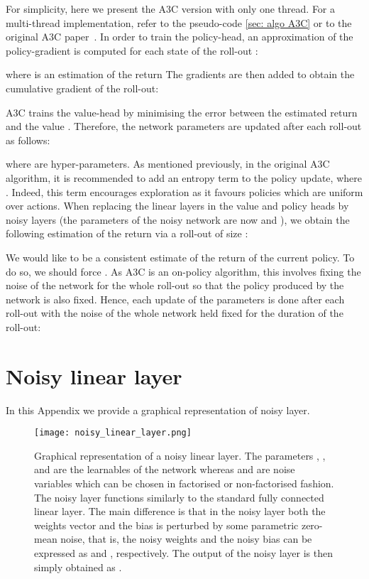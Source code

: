 \documentclass{article}
\begin{document}
For simplicity, here we present the A3C version with only one thread. For a  multi-thread implementation, refer to the pseudo-code \ref{sec: algo A3C} or to the original A3C paper~\citep{mnih2016asynchronous}. In order to train the policy-head, an approximation of the policy-gradient is computed for each state of the roll-out :
 
 where  is an estimation of the return  The gradients are then added to obtain the cumulative gradient of the roll-out:
 
 A3C trains the value-head by minimising the error between the estimated return and the value . Therefore, the network parameters  are updated after each roll-out as follows:
 
 where  are hyper-parameters. As mentioned previously, in the original A3C algorithm, it is recommended to add an entropy term  to the policy update, where . Indeed, this term encourages exploration as it favours policies which are uniform over actions. 
 When replacing the linear layers in the value and policy heads by noisy layers (the parameters of the noisy network are now  and ), we obtain the following estimation of the return via a roll-out of size :
 
 We would like  to be a consistent estimate of the return of the current policy. To do so, we should force . As A3C is an on-policy algorithm, this involves fixing the noise of the network for the whole roll-out so that the policy produced by the network is also fixed. Hence, each update of the parameters  is done after each roll-out with the noise of the whole network held fixed for the duration of the roll-out:
 



\newpage

\section{Noisy linear layer}
 \label{sec:noisy linear layer}
 
 In this Appendix we provide a graphical representation of noisy layer.
 
\begin{figure}[!htp]
\begin{centering}
    \texttt{[image: noisy\_linear\_layer.png]}
    \caption{Graphical representation of a noisy linear layer. The parameters , ,  and  are the learnables of the network whereas   and  are noise  variables which can be chosen in factorised or non-factorised fashion. The noisy layer functions similarly to the standard fully connected linear layer. The main difference is that in the noisy layer both the weights vector and the bias is perturbed by some parametric zero-mean noise, that is, the noisy weights and the noisy bias can be expressed as  and , respectively. The output of the noisy layer is then simply obtained as .}
    \label{fig:noisy linear layer} 
    \end{centering}
\end{figure}
\end{document}
